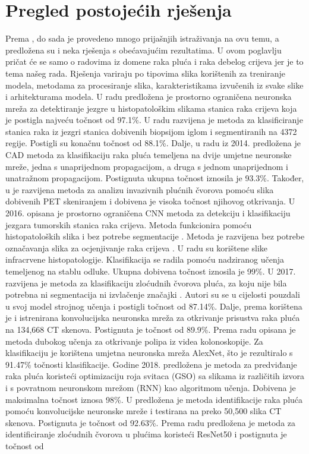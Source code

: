 \documentclass[conference, utf8]{IEEEtran}
\begin{document}
	\section{Pregled postojećih rješenja}
	Prema \cite{mehmood2022malignancy}, do sada je provedeno mnogo prijašnjih istraživanja na ovu temu, a predložena su i neka rješenja s obećavajućim rezultatima. U ovom poglavlju pričat će se samo o radovima iz domene raka pluća i raka debelog crijeva jer je to tema našeg rada. Rješenja variraju po tipovima slika korištenih za treniranje modela, metodama za procesiranje slika, karakteristikama izvučenih iz svake slike i arhitekturama modela. U radu \cite{Sirinukunwattana} predložena je prostorno ograničena neuronska mreža za detektiranje jezgre u histopatološkim slikama stanica raka crijeva koja je postigla najveću točnost od 97.1\%. U radu \cite{Multimodal_sparse} razvijena je metoda za klasificiranje stanica raka iz jezgri stanica dobivenih biopsijom iglom i segmentiranih na 4372 regije. Postigli su konačnu točnost od 88.1\%. Dalje, u radu iz 2014.\cite{kuruvilla2014lung} predložena je CAD metoda za klasifikaciju raka pluća temeljena na dvije umjetne neuronske mreže, jedna s unaprijednom propagacijom, a druga s jednom unaprijednom i unatražnom propagacijom. Postignuta ukupna točnost iznosila je 93.3\%. Također, u \cite{deppen2014accuracy} je razvijena metoda za analizu invazivnih plućnih čvorova pomoću slika dobivenih PET skeniranjem i dobivena je visoka točnost njihovog otkrivanja. U 2016. opisana je prostorno ograničena CNN metoda za detekciju i klasifikaciju jezgara tumorskih stanica raka crijeva. Metoda funkcionira pomoću histopatoloških slika i bez potrebe segmentacije \cite{sirinukunwattana2016locality}. Metoda je razvijena bez potrebe označavanja slika za ocjenjivanje raka crijeva \cite{kuepper2016label}. U radu su korištene slike infracrvene histopatologije. Klasifikacija se radila pomoću nadziranog učenja temeljenog na stablu odluke. Ukupna dobivena točnost iznosila je 99\%. U 2017. razvijena je metoda za klasifikaciju zloćudnih čvorova pluća, za koju nije bila potrebna ni segmentacija ni izvlačenje značajki \cite{shen2017multi}. Autori su se u cijelosti pouzdali u svoj model strojnog učenja i postigli točnost od 87.14\%. Dalje, prema \cite{sun2017automatic} korištena je i istrenirana konvolucijska neuronska mreža za otkrivanje prisustva raka pluća na 134,668 CT skenova. Postignuta je točnost od 89.9\%. Prema radu \cite{yuan2017automatic} opisana je metoda dubokog učenja za otkrivanje polipa iz videa kolonoskopije. Za klasifikaciju je korištena umjetna neuronska mreža AlexNet, što je rezultiralo s 91.47\% točnosti klasifikacije. Godine 2018. predložena je metoda za predviđanje raka pluća \cite{selvanambi2020lung} koristeći optimizaciju roja svitaca (GSO) sa slikama iz različitih izvora i s povratnom neuronskom mrežom (RNN) kao algoritmom učenja. Dobivena je maksimalna točnost iznosa 98\%. U \cite{de2018classification} predložena je metoda identifikacije raka pluća pomoću konvolucijske neuronske mreže i testirana na preko 50,500 slika CT skenova. Postignuta je točnost od 92.63\%. Prema radu \cite{da2020lung} predložena je metoda za identificiranje zloćudnih čvorova u plućima koristeći ResNet50 i postignuta je točnost od 
\end{document}
